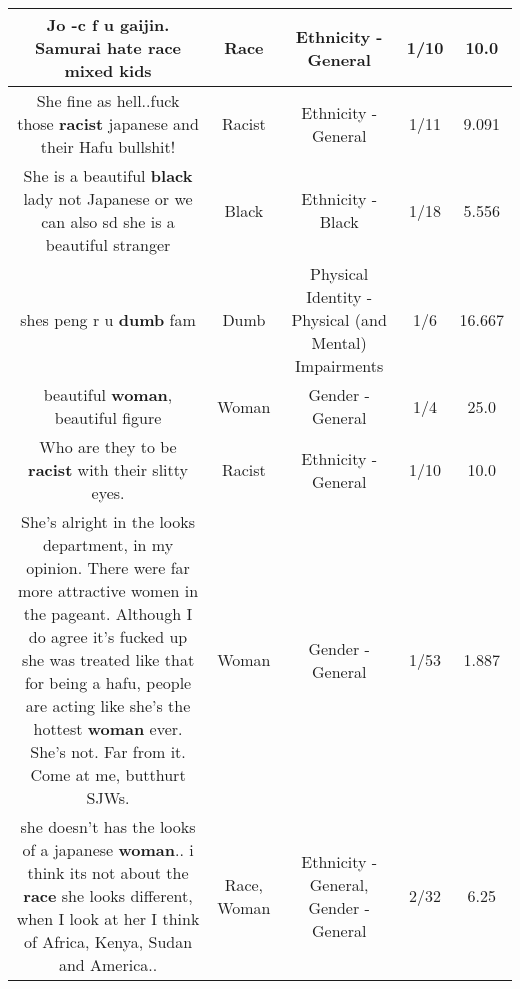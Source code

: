 \documentclass[11pt]{article}
\newlength\mylength
\begin{document}
\begin{center}
\begin{longtable}{|C{.65\mylength}|C{.30\mylength}|C{.12\mylength}|C{.12\mylength}|C{.12\mylength}|}
  \small Jo -c f u gaijin. Samurai hate \textbf{race} mixed kids\normalsize   & Race & Ethnicity - General & 1/10 & 10.0 \\  \hline
  \small She fine as hell..fuck those \textbf{racist} japanese and their Hafu bullshit!\normalsize   & Racist & Ethnicity - General & 1/11 & 9.091 \\  \hline
  \small She is a beautiful \textbf{black} lady not Japanese or we can also sd she is a beautiful stranger\normalsize   & Black & Ethnicity - Black & 1/18 & 5.556 \\  \hline
  \small shes peng r u \textbf{dumb} fam\normalsize   & Dumb & Physical Identity - Physical (and Mental) Impairments & 1/6 & 16.667 \\  \hline
  \small beautiful \textbf{woman}, beautiful figure\normalsize   & Woman & Gender - General & 1/4 & 25.0 \\  \hline
  \small Who are they to be \textbf{racist} with their slitty eyes.\normalsize   & Racist & Ethnicity - General & 1/10 & 10.0 \\  \hline
  \small She's alright in the looks department, in my opinion. There were far more attractive women in the pageant. Although I do agree it's fucked up she was treated like that for being a hafu, people are acting like she's the hottest \textbf{woman} ever. She's not. Far from it. Come at me, butthurt SJWs.\normalsize   & Woman & Gender - General & 1/53 & 1.887 \\  \hline
  \small she doesn't has the looks of a japanese \textbf{woman}.. i think its not about the \textbf{race} she looks different, when I look at her I think of Africa, Kenya, Sudan and America..\normalsize   & Race, Woman & Ethnicity - General, Gender - General & 2/32 & 6.25 \\  \hline

\end{longtable}
\end{center}
\end{document}
